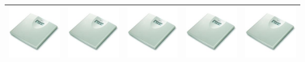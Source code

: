 \documentclass[11pt,a4paper,titlepage]{article}
\begin{document}
\begin{tabular}{| m{80 pt} | m{80 pt} | m{80 pt} | m{80 pt} | m{80 pt} |}\hline
  \includegraphics[scale=0.40,bb=0 0 150 150]{prod_bs1.jpg} & 
  \includegraphics[scale=0.40,bb=0 0 150 150]{prod_bs2.jpg} & 
  \includegraphics[scale=0.40,bb=0 0 150 150]{prod_bs3.jpg} & 
  \includegraphics[scale=0.40,bb=0 0 150 150]{prod_bs4.jpg} & 
  \includegraphics[scale=0.40,bb=0 0 150 150]{prod_bs5.jpg} \\\hline

\end{tabular}
\end{document}
